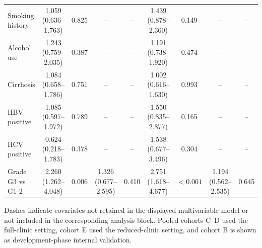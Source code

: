 \begin{table}[!htbp]
{\begin{tabular}{lcccccccc}
Smoking history & 1.059 (0.636--1.763) & 0.825 & -- & -- & 1.439 (0.878--2.360) & 0.149 & -- & -- \\
Alcohol use & 1.243 (0.759--2.035) & 0.387 & -- & -- & 1.191 (0.738--1.920) & 0.474 & -- & -- \\
Cirrhosis & 1.084 (0.658--1.786) & 0.751 & -- & -- & 1.002 (0.616--1.630) & 0.993 & -- & -- \\
HBV positive & 1.085 (0.597--1.972) & 0.789 & -- & -- & 1.550 (0.835--2.877) & 0.165 & -- & -- \\
HCV positive & 0.624 (0.218--1.783) & 0.378 & -- & -- & 1.538 (0.677--3.496) & 0.304 & -- & -- \\
Grade G3 vs G1-2 & 2.260 (1.262--4.048) & 0.006 & 1.326 (0.677--2.595) & 0.410 & 2.751 (1.618--4.677) & $<0.001$ & 1.194 (0.562--2.535) & 0.645 \\
\bottomrule
\end{tabular}%
}
\vspace{0.3em}
\parbox{0.98\textwidth}{\footnotesize Dashes indicate covariates not retained in the displayed multivariable model or not included in the corresponding analysis block. Pooled cohorts C--D used the full-clinic setting, cohort E used the reduced-clinic setting, and cohort B is shown as development-phase internal validation.}
\end{table}
